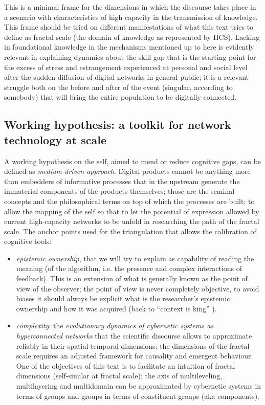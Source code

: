 \documentclass[14pt]{extarticle}
\begin{document}
\hspace*{15mm}This is a minimal frame for the dimensions in which the discourse takes place in a scenario with characteristics of high capacity in the transmission of knowledge. This frame should be tried on different manifestations of what this text tries to define as fractal scale (the domain of knowledge as represented by HCS).
\newline
\hspace*{15mm}Lacking in foundational knowledge in the mechanisms mentioned up to here is evidently relevant in explaining dynamics about the skill gap that is the starting point for the excess of stress and estrangement experienced at personal and social level after the sudden diffusion of digital networks in general public; it is a relevant struggle both on the before and after of the event (singular, according to somebody) that will bring the entire population to be digitally connected.

\subsection*{Working hypothesis: a toolkit for network technology at scale}
\label{subsec:toolkit}

\hspace*{15mm}A working hypothesis on the self, aimed to mend or reduce cognitive gaps, can be defined as \textit{medium-driven approach}. Digital products cannot be anything more than embedders of informative processes that in the upstream generate the immaterial components of the products themselves; those are the seminal concepts and the philosophical terms on top of which the processes are built; to allow the mapping of the self so that to let the potential of expression allowed by current high-capacity networks to be unfold in researching the path of the fractal scale. The anchor points used for the triangulation that allows the calibration of cognitive tools:
\begin{itemize}
\item \textit{epistemic ownership}, that we will try to explain as capability of reading the meaning (of the algorithm, i.e. the presence and complex interactions of feedback). This is an extension of what is generally known as the point of view of the observer; the point of view is never completely objective, to avoid biases it should always be explicit what is the researcher's epistemic ownership and how it was acquired (back to “context is king” \cite{doi:10.1057}). 
\item \textit{complexity}: the \textit{evolutionary dynamics of cybernetic systems as hyperconnected networks} that the scientific discourse allows to approximate reliably in their spatial-temporal dimensions; the dimensions of the fractal scale requires an adjusted framework for causality and emergent behaviour.
One of the objectives of this text is to facilitate an intuition of fractal dimensions (self-similar at fractal scale); the axis of multileveling, multilayering and multidomain can be approximated by cybernetic systems in terms of groups and groups in terms of constituent groups (aka components). 
\end{itemize}
\end{document}
